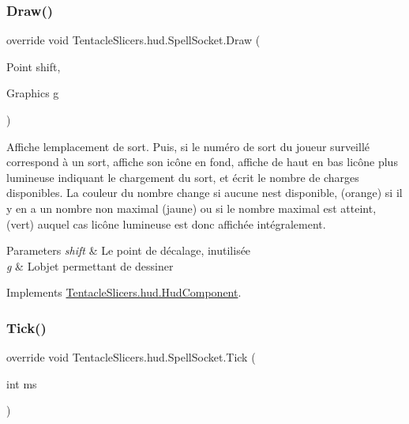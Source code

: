 \subsubsection{\texorpdfstring{Draw()}{Draw()}}
{\footnotesize\ttfamily override void Tentacle\+Slicers.\+hud.\+Spell\+Socket.\+Draw (\begin{DoxyParamCaption}\item[{Point}]{shift,  }\item[{Graphics}]{g }\end{DoxyParamCaption})\hspace{0.3cm}{\ttfamily [virtual]}}



Affiche l\textquotesingle{}emplacement de sort. Puis, si le numéro de sort du joueur surveillé correspond à un sort, affiche son icône en fond, affiche de haut en bas l\textquotesingle{}icône plus lumineuse indiquant le chargement du sort, et écrit le nombre de charges disponibles. La couleur du nombre change si aucune n\textquotesingle{}est disponible, (orange) si il y en a un nombre non maximal (jaune) ou si le nombre maximal est atteint, (vert) auquel cas l\textquotesingle{}icône lumineuse est donc affichée intégralement. 


\begin{DoxyParams}{Parameters}
{\em shift} & Le point de décalage, inutilisée \\
\hline
{\em g} & L\textquotesingle{}objet permettant de dessiner \\
\hline
\end{DoxyParams}


Implements \hyperlink{class_tentacle_slicers_1_1hud_1_1_hud_component}{Tentacle\+Slicers.\+hud.\+Hud\+Component}.

\mbox{\label{class_tentacle_slicers_1_1hud_1_1_spell_socket_a0b15896dbd161ba9abea4616a18ddd69}} 
\subsubsection{\texorpdfstring{Tick()}{Tick()}}
{\footnotesize\ttfamily override void Tentacle\+Slicers.\+hud.\+Spell\+Socket.\+Tick (\begin{DoxyParamCaption}\item[{int}]{ms }\end{DoxyParamCaption})\hspace{0.3cm}{\ttfamily [virtual]}}



